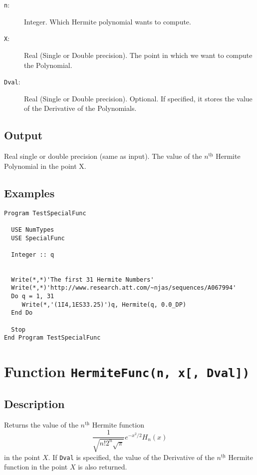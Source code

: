 \begin{description}
\item[\texttt{n}:] Integer. Which Hermite polynomial wants to compute.
\item[\texttt{X}:] Real (Single or Double precision). The point in
  which we want to compute the Polynomial.
\item[\texttt{Dval}:] Real (Single or Double precision). Optional. If
  specified, it stores the value of the Derivative of the
  Polynomials.
\end{description}

\subsection{Output}

Real single or double precision (same as input). The value of the
$n^{\underline{\text{th}}}$ Hermite Polynomial in the point X.

\subsection{Examples}

\begin{lstlisting}[emph=Hermite,
                   emphstyle=\color{blue},
                   frame=trBL,
                   caption=Computing the first 31 Hermite numbers.,
                   label=hermite]
Program TestSpecialFunc

  USE NumTypes
  USE SpecialFunc

  Integer :: q


  Write(*,*)'The first 31 Hermite Numbers'
  Write(*,*)'http://www.research.att.com/~njas/sequences/A067994'
  Do q = 1, 31
     Write(*,'(1I4,1ES33.25)')q, Hermite(q, 0.0_DP)
  End Do

  Stop
End Program TestSpecialFunc
\end{lstlisting}

\section{Function \texttt{HermiteFunc(n, x[, Dval])}}

\subsection{Description}

Returns the value of the $n^{\underline{\text{th}}}$ Hermite
function
\begin{equation}
  \frac{1}{\sqrt{n!2^n\sqrt{\pi}}}e^{-x^2/2}H_n(x)
\end{equation}
in the point $X$. If \texttt{Dval} is specified, the value
of the Derivative of the $n^{\underline{\text{th}}}$ Hermite
function in the point $X$ is also returned.

